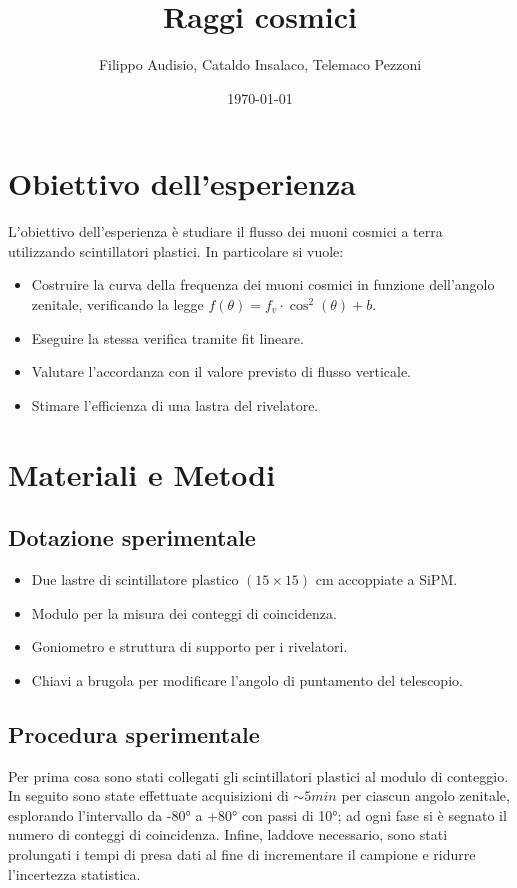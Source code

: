 \documentclass[a4paper,12pt]{article}
\title{\textbf{Raggi cosmici}}
\author{Filippo Audisio, Cataldo Insalaco, Telemaco Pezzoni}
\date{\today}
\begin{document}
\maketitle


\section{Obiettivo dell'esperienza}
L'obiettivo dell'esperienza è studiare il flusso dei muoni cosmici a terra utilizzando scintillatori plastici. In particolare si vuole:
\begin{itemize}
    \item Costruire la curva della frequenza dei muoni cosmici in funzione dell'angolo zenitale, verificando la legge $f(\theta) = f_v \cdot \cos^2(\theta) + b$.
    \item Eseguire la stessa verifica tramite fit lineare.
    \item Valutare l'accordanza con il valore previsto di flusso verticale.
    \item Stimare l'efficienza di una lastra del rivelatore.
\end{itemize}

\section{Materiali e Metodi}

\subsection{Dotazione sperimentale}
\begin{itemize}
    \item Due lastre di scintillatore plastico $(15 \times 15) \text{ cm}$ accoppiate a SiPM.
    \item Modulo per la misura dei conteggi di coincidenza.
    \item Goniometro e struttura di supporto per i rivelatori.
    \item Chiavi a brugola per modificare l'angolo di puntamento del telescopio.
\end{itemize}

\subsection{Procedura sperimentale}
Per prima cosa sono stati collegati gli scintillatori plastici al modulo di conteggio. In seguito sono state effettuate acquisizioni di $\sim 5 \unit{min}$ per ciascun angolo zenitale, esplorando l'intervallo da -80° a +80° con passi di 10°; ad ogni fase si è segnato il numero di conteggi di coincidenza.
Infine, laddove necessario, sono stati prolungati i tempi di presa dati al fine di incrementare il campione e ridurre l'incertezza statistica.
\end{document}
